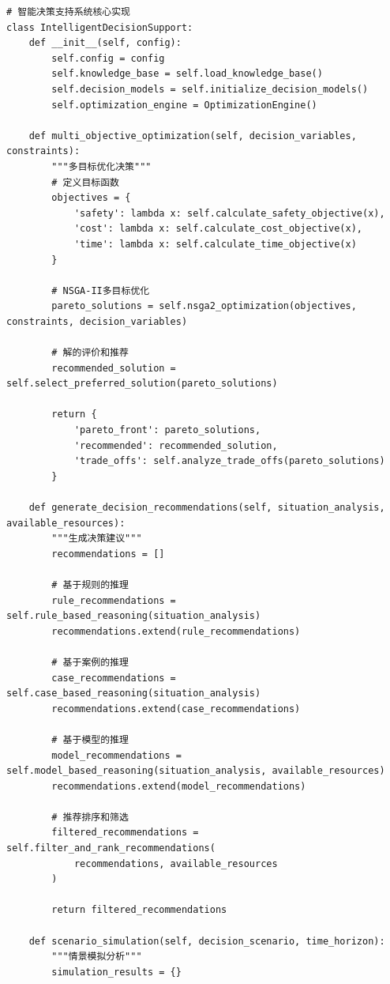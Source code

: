 \begin{lstlisting}[style=python]
# 智能决策支持系统核心实现  
class IntelligentDecisionSupport:
    def __init__(self, config):
        self.config = config
        self.knowledge_base = self.load_knowledge_base()
        self.decision_models = self.initialize_decision_models()
        self.optimization_engine = OptimizationEngine()
        
    def multi_objective_optimization(self, decision_variables, constraints):
        """多目标优化决策"""
        # 定义目标函数
        objectives = {
            'safety': lambda x: self.calculate_safety_objective(x),
            'cost': lambda x: self.calculate_cost_objective(x),  
            'time': lambda x: self.calculate_time_objective(x)
        }
        
        # NSGA-II多目标优化
        pareto_solutions = self.nsga2_optimization(objectives, constraints, decision_variables)
        
        # 解的评价和推荐
        recommended_solution = self.select_preferred_solution(pareto_solutions)
        
        return {
            'pareto_front': pareto_solutions,
            'recommended': recommended_solution,
            'trade_offs': self.analyze_trade_offs(pareto_solutions)
        }
    
    def generate_decision_recommendations(self, situation_analysis, available_resources):
        """生成决策建议"""
        recommendations = []
        
        # 基于规则的推理
        rule_recommendations = self.rule_based_reasoning(situation_analysis)
        recommendations.extend(rule_recommendations)
        
        # 基于案例的推理
        case_recommendations = self.case_based_reasoning(situation_analysis)
        recommendations.extend(case_recommendations)
        
        # 基于模型的推理  
        model_recommendations = self.model_based_reasoning(situation_analysis, available_resources)
        recommendations.extend(model_recommendations)
        
        # 推荐排序和筛选
        filtered_recommendations = self.filter_and_rank_recommendations(
            recommendations, available_resources
        )
        
        return filtered_recommendations
    
    def scenario_simulation(self, decision_scenario, time_horizon):
        """情景模拟分析"""
        simulation_results = {}
        

\end{lstlisting}
